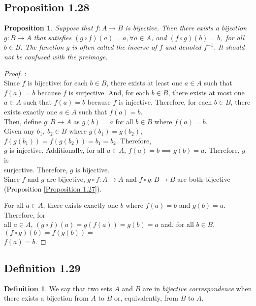 \documentclass[openany, amssymb, psamsfonts]{amsart}
\newtheorem{prop}{Proposition}[section]
\theoremstyle{definition}
\newtheorem{defn}{Definition}[section]
\numberwithin{equation}{section}
\begin{document}
\subsection{Proposition 1.28}
\begin{prop} 
Suppose that $f \colon A \rightarrow B$ is bijective.  
Then there exists a bijection $g \colon B \rightarrow A$ that satisfies $(g\circ f)(a)=a, \forall a\in A$, and $(f\circ g)(b)=b,$ for all $b\in B.$ 
The function $g$ is often called the \emph{inverse} of $f$ and  denoted $f^{-1}$. It should not be confused with the preimage.
\end{prop}
\begin{proof}:\\
    \indent\indent Since $f$ is bijective: for each $b \in B$, there exists at least one $a \in A$ such that $f(a) = b$ \indent\indent because $f$ is surjective. And, for each $b \in B$, there exists at most one $a \in A$ such that \indent\indent $f(a) = b$ because $f$ is injective. Therefore, for each $b \in B$, there exists exactly one 
\indent\indent $a \in A$ such that $f(a) = b$.\\

\indent\indent Then, define $g : B \rightarrow A$ as $g(b) = a$ for all $b \in B$ where $f(a) = b$.\\
\indent\indent\indent\indent Given any $b_1, \: b_2 \in B$ where $g(b_1) = g(b_2)$, $f(g(b_1)) = f(g(b_2)) = b_1 = b_2$. Therefore,\\
\indent\indent\indent\indent $g$ is injective. Additionally, for all $a \in A$, $f(a) = b \implies g(b) = a$. Therefore, $g$ is\\
\indent\indent\indent\indent surjective. Therefore, $g$ is bijective.\\

\indent\indent Since $f$ and $g$ are bijective, $g \circ f : A \rightarrow A$ and $f \circ g : B \rightarrow B$ are both bijective
\indent\indent (Proposition \ref{Proposition 1.27}).

\indent\indent\indent\indent For all $a \in A$, there exists exactly one $b$ where $f(a) = b$ and $g(b) = a$. Therefore, for\\
\indent\indent\indent\indent all $a \in A$, $(g \circ f)(a) = g(f(a)) = g(b) = a$ and, for all $b \in B$, $(f \circ g)(b) = f(g(b)) = $\\
\indent\indent\indent\indent $f(a) = b$.
\end{proof}
\subsection{Definition 1.29}
\begin{defn}
We say that two sets $A$ and $B$ are in \emph{bijective correspondence} when there exists a bijection from $A$ to $B$ or, equivalently, from $B$ to $A$.
\end{defn}
\end{document}
